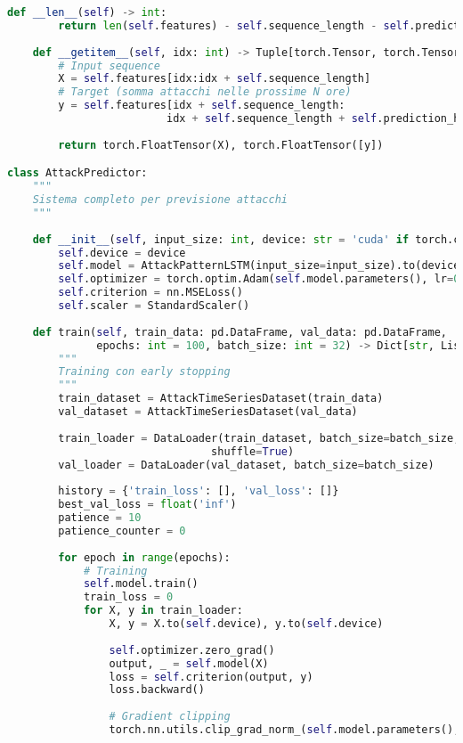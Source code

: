 \begin{lstlisting}[language=Python, caption=LSTM per Previsione Pattern di Attacco]
    def __len__(self) -> int:
        return len(self.features) - self.sequence_length - self.prediction_horizon + 1
    
    def __getitem__(self, idx: int) -> Tuple[torch.Tensor, torch.Tensor]:
        # Input sequence
        X = self.features[idx:idx + self.sequence_length]
        # Target (somma attacchi nelle prossime N ore)
        y = self.features[idx + self.sequence_length:
                         idx + self.sequence_length + self.prediction_horizon, 0].sum()
        
        return torch.FloatTensor(X), torch.FloatTensor([y])

class AttackPredictor:
    """
    Sistema completo per previsione attacchi
    """
    
    def __init__(self, input_size: int, device: str = 'cuda' if torch.cuda.is_available() else 'cpu'):
        self.device = device
        self.model = AttackPatternLSTM(input_size=input_size).to(device)
        self.optimizer = torch.optim.Adam(self.model.parameters(), lr=0.001)
        self.criterion = nn.MSELoss()
        self.scaler = StandardScaler()
        
    def train(self, train_data: pd.DataFrame, val_data: pd.DataFrame,
              epochs: int = 100, batch_size: int = 32) -> Dict[str, List[float]]:
        """
        Training con early stopping
        """
        train_dataset = AttackTimeSeriesDataset(train_data)
        val_dataset = AttackTimeSeriesDataset(val_data)
        
        train_loader = DataLoader(train_dataset, batch_size=batch_size, 
                                shuffle=True)
        val_loader = DataLoader(val_dataset, batch_size=batch_size)
        
        history = {'train_loss': [], 'val_loss': []}
        best_val_loss = float('inf')
        patience = 10
        patience_counter = 0
        
        for epoch in range(epochs):
            # Training
            self.model.train()
            train_loss = 0
            for X, y in train_loader:
                X, y = X.to(self.device), y.to(self.device)
                
                self.optimizer.zero_grad()
                output, _ = self.model(X)
                loss = self.criterion(output, y)
                loss.backward()
                
                # Gradient clipping
                torch.nn.utils.clip_grad_norm_(self.model.parameters(), 1.0)
                

\end{lstlisting}
